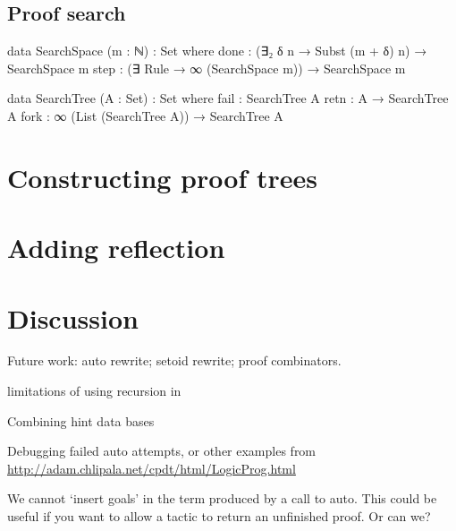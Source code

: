 \documentclass[preprint]{sigplanconf}
\begin{document}
\subsection{Proof search}

\begin{code}
  data SearchSpace (m : ℕ) : Set where
    done : (∃₂ δ n → Subst (m + δ) n) → SearchSpace m
    step : (∃ Rule → ∞ (SearchSpace m)) → SearchSpace m
\end{code}

\begin{code}
  data SearchTree (A : Set) : Set where
    fail : SearchTree A
    retn : A → SearchTree A
    fork : ∞ (List (SearchTree A)) → SearchTree A
\end{code}


\section{Constructing proof trees}
\label{sec:proofs}

\section{Adding reflection}
\label{sec:reflection}



\section{Discussion}
\label{sec:discussion}


Future work: auto rewrite; setoid rewrite; proof combinators.

limitations of using recursion in 

Combining hint data bases

Debugging failed auto attempts, or other examples from
\url{http://adam.chlipala.net/cpdt/html/LogicProg.html}

We cannot `insert goals' in the term produced by a call to auto. This
could be useful if you want to allow a tactic to return an unfinished
proof. Or can we?



\end{document}
